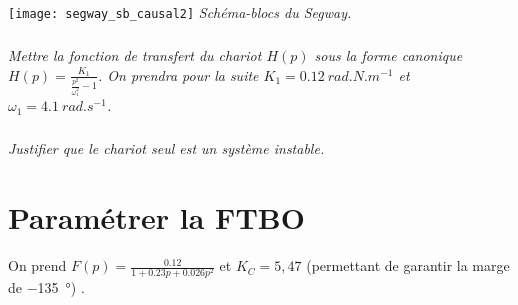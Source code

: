 \begin{multicols}{2}
\begin{center}%
\texttt{[image: segway\_sb\_causal2]}
\textit{Schéma-blocs du Segway\textregistered.} \label{ex_segway_SB}
\end{center}%

\subparagraph{}\textit{Mettre la fonction de transfert du chariot $H(p)$ sous la forme canonique $H(p)=\frac{K_1}{\frac{p^2}{\omega_1^2}-1}$. On prendra pour la suite $K_1=\SI{0.12}{rad. N.m^{-1}}$ et $\omega_1=\SI{4.1}{rad. s^{-1}}$.}

\subparagraph{}\textit{Justifier que le chariot seul est un système instable.}

\section*{Paramétrer la FTBO}

On prend $F(p)=\frac{\num{0.12}}{1+\num{0.23} p + \num{0.026} p^2}$ et $K_C=5,47$ (permettant de garantir la marge de  \SI{-135}{\degree}) .





\end{multicols}
